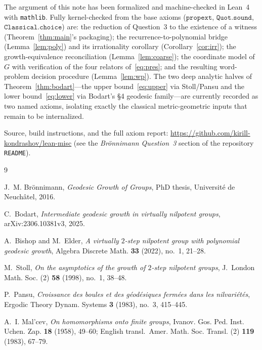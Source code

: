 \documentclass[reqno]{amsart}
\theoremstyle{plain}
\theoremstyle{definition}
\theoremstyle{remark}
\begin{document}
The argument of this note has been formalized and machine-checked in Lean~4 with
\texttt{mathlib}. Fully kernel-checked from the base axioms ($\mathtt{propext}$,
$\mathtt{Quot.sound}$, $\mathtt{Classical.choice}$) are: the reduction of Question~3 to the
existence of a witness (Theorem~\ref{thm:main}'s packaging); the recurrence-to-polynomial bridge
(Lemma~\ref{lem:poly}) and its irrationality corollary (Corollary~\ref{cor:irr}); the
growth-equivalence reconciliation (Lemma~\ref{lem:coarse}); the coordinate model of $G$ with
verification of the four relators of~\eqref{eq:pres}; and the resulting word-problem decision
procedure (Lemma~\ref{lem:wp}). The two deep analytic halves of Theorem~\ref{thm:bodart}---the
upper bound~\eqref{eq:upper} via Stoll/Pansu and the lower bound~\eqref{eq:lower} via Bodart's
\S4 geodesic family---are currently recorded as two named axioms, isolating exactly the classical
metric-geometric inputs that remain to be internalized.

\medskip
\noindent Source, build instructions, and the full axiom report:
\url{https://github.com/kirill-kondrashov/lean-misc} (see the \emph{Br\"onnimann Question~3}
section of the repository \texttt{README}).

\begin{thebibliography}{9}

J.~M. Br\"onnimann, \textit{Geodesic Growth of Groups}, PhD thesis, Universit\'e de Neuch\^atel,
2016.

C.~Bodart, \textit{Intermediate geodesic growth in virtually nilpotent groups},
arXiv:2306.10381v3, 2025.

A.~Bishop and M.~Elder, \textit{A virtually $2$-step nilpotent group with polynomial geodesic
growth}, Algebra Discrete Math. \textbf{33} (2022), no.~1, 21--28.

M.~Stoll, \textit{On the asymptotics of the growth of $2$-step nilpotent groups},
J.~London Math. Soc. (2) \textbf{58} (1998), no.~1, 38--48.

P.~Pansu, \textit{Croissance des boules et des g\'eod\'esiques ferm\'ees dans les
nilvari\'et\'es}, Ergodic Theory Dynam. Systems \textbf{3} (1983), no.~3, 415--445.

A.~I. Mal'cev, \textit{On homomorphisms onto finite groups}, Ivanov. Gos. Ped. Inst. Uchen. Zap.
\textbf{18} (1958), 49--60; English transl.\ Amer. Math. Soc. Transl. (2) \textbf{119} (1983),
67--79.

\end{thebibliography}
\end{document}
